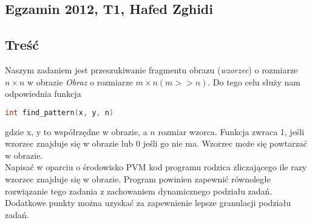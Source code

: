 	\subsection{Egzamin 2012, T1, Hafed Zghidi}
		\subsection{Treść}
			Naszym zadaniem jest przeszukiwanie fragmentu obrazu (\textit{wzorzec}) o rozmiarze $ n\times n $ w obrazie \textit{Obraz} o rozmiarze $ m\times n (m>>n) $. Do tego celu służy nam odpowiednia funkcja\\
			\begin{lstlisting}[language=C]
			int find_pattern(x, y, n)
			\end{lstlisting}
			gdzie x, y to współrzędne w obrazie, a $ n $ rozmiar wzorca. Funkcja zwraca 1, jeśli wzorzec znajduje się w obrazie lub 0 jeśli go nie ma. Wzorzec może się powtarzać w obrazie.\\
			Napisać w oparciu o środowisko PVM kod programu rodzica zliczającego ile razy wzorzec znajduje się w obrazie. Program powinien zapewnić równoległe rozwiązanie tego zadania z zachowaniem dynamicznego podziału zadań. Dodatkowe punkty można uzyskać za zapewnienie lepsze granulacji podziału zadań.
